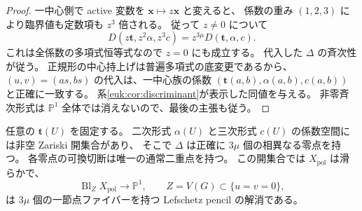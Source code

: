 \begin{proof}
一中心側で active 変数を $\mathbf x\mapsto z\mathbf x$ と変えると、
係数の重み $(1,2,3)$ により臨界値も定数項も $z^3$ 倍される。
従って $z\ne0$ について
\[
 D(z\mathbf t,z^2\alpha,z^3c)=z^{3\mu}D(\mathbf t,\alpha,c).
\]
これは全係数の多項式恒等式なので $z=0$ にも成立する。
代入した $\Delta$ の斉次性が従う。
正規形の中心持上げは普遍多項式の底変更であるから、
$(u,v)=(as,bs)$ の代入は、一中心族の係数
$(\mathbf t(a,b),\alpha(a,b),c(a,b))$ と正確に一致する。
系\ref{euk:cor:discriminant}が表示した同値を与える。
非零斉次形式は $\mathbb P^1$ 全体では消えないので、最後の主張も従う。
\end{proof}

\begin{theorem}
\label{mcpn:thm:lefschetz-pencil}
任意の $\mathbf t(U)$ を固定する。
二次形式 $\alpha(U)$ と三次形式 $c(U)$ の係数空間には非空 Zariski 開集合があり、
そこで $\Delta$ は正確に $3\mu$ 個の相異なる零点を持つ。
各零点の可換切断は唯一の通常二重点を持つ。
この開集合では $X_{\mathrm{pol}}$ は滑らかで、
\[
 \operatorname{Bl}_{Z}X_{\mathrm{pol}}\longrightarrow\mathbb P^1,
 \qquad Z=V(G)\subset\{u=v=0\},
\]
は $3\mu$ 個の一節点ファイバーを持つ Lefschetz pencil の解消である。
\end{theorem}


